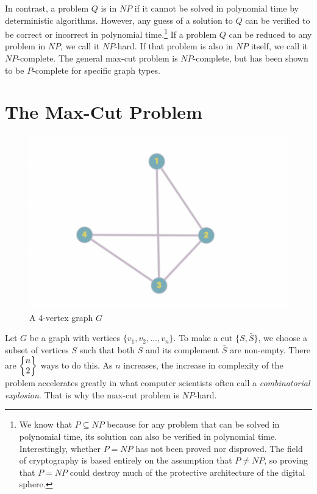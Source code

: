 \par In contrast, a problem $Q$ is in $NP$ if it cannot be solved in polynomial time by deterministic algorithms. However, any guess of a solution to $Q$ can be verified to be correct or incorrect in polynomial time.\footnote{We know that $P \subseteq NP$ because for any problem that can be solved in polynomial time, its solution can also be verified in polynomial time. Interestingly, whether $P = NP$ has not been proved nor disproved. The field of cryptography is based entirely on the assumption that $P \not= NP$, so proving that $P = NP$ could destroy much of the protective architecture of the digital sphere.} If a problem $Q$ can be reduced to any problem in $NP$, we call it $NP$-hard. If that problem is also in $NP$ itself, we call it $NP$-complete. The general max-cut problem is $NP$-complete, but has been shown to be $P$-complete for specific graph types.

\section{The Max-Cut Problem}

\begin{figure}[h]
    \centering
    \includegraphics[scale=.35]{four_vertex.png}
    \caption{A 4-vertex graph $G$}
    \label{fig:four_vertex}
\end{figure}

\par Let $G$ be a graph with vertices $\{v_1,v_2,\dots,v_n\}$. To make a cut $\{S,\bar{S}\}$, we choose a subset of vertices $S$ such that both $S$ and its complement $\bar{S}$ are non-empty. There are $\begin{Bmatrix} n\\2 \end{Bmatrix}$ ways to do this. As $n$ increases, the increase in complexity of the problem accelerates greatly in what computer scientists often call a \textit{combinatorial explosion}. That is why the max-cut problem is $NP$-hard. \\


